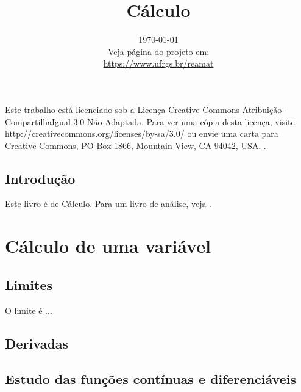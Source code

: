 \documentclass[12pt]{book}
\begin{document}
\frontmatter

\title{Cálculo}
\date{\today\vspace{1cm}\\\small{Veja página do projeto em:\\
\url{https://www.ufrgs.br/reamat}}}

\maketitle





\newpage

\par Este trabalho está licenciado sob a Licença Creative Commons Atribuição-CompartilhaIgual 3.0 Não Adaptada. Para ver uma cópia desta licença, visite http://creativecommons.org/licenses/by-sa/3.0/ ou envie uma carta para Creative Commons, PO Box 1866, Mountain View, CA 94042, USA.
.



\tableofcontents
\listoffigures

\listoftables

\cleardoublepage
\chapter*{Introdução}

Este livro é de Cálculo. Para um livro de análise, veja \cite{Rudin}.


\part{Cálculo de uma variável}

\chapter{Limites}
O limite é ... 
\chapter{Derivadas}

\chapter{Estudo das funções contínuas e diferenciáveis}
\end{document}
